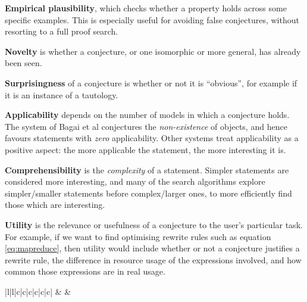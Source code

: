 \textbf{Empirical plausibility}, which checks whether a property holds across
some specific examples. This is especially useful for avoiding  false
conjectures, without resorting to a full proof search.

\textbf{Novelty} is whether a conjecture, or one isomorphic or more general, has
already been seen.

\textbf{Surprisingness} of a conjecture is whether or not it is ``obvious'', for
example if it is an instance of a tautology.

\textbf{Applicability} depends on the number of models in which a conjecture
holds. The system of Bagai et al conjectures the \emph{non-existence} of
objects, and hence favours statements with \emph{zero} applicability. Other
systems treat applicability as a positive aspect: the more applicable the
statement, the more interesting it is.

\textbf{Comprehensibility} is the \emph{complexity} of a statement. Simpler
statements are considered more interesting, and many of the search algorithms
explore simpler/smaller statements before complex/larger ones, to more
efficiently find those which are interesting.

\textbf{Utility} is the relevance or usefulness of a conjecture to the user's
particular task. For example, if we want to find optimising rewrite rules such
as equation \ref{eq:mapreduce}, then utility would include whether or not a
conjecture justifies a rewrite rule, the difference in resource usage of the
expressions involved, and how common those expressions are in real usage.

\begin{table}
  \centering
  \begin{tabular}{ |l|l|c|c|c|c|c|c| }
    \hline
                         &
                &
     \\ \hhline{~~------}
    \tRow{            &                    & \iE & \iN & \iS & \iA & \iC & \iU}
  \end{tabular}
  \caption{Classification of ATE systems from \cite{colton2000notion}, extended
    to those compared in \cite{claessen2013automating} (QuickSpec is the
    conjecture generation component of HipSpec). The interestingness measures
    are \iE{}mpirical plausibility, \iN{}ovelty, \iS{}urprisingness,
    \iA{}pplicability, \iC{}omprehensibility (low complexity) and \iU{}tility.}
  \label{table:colton}
\end{table}

